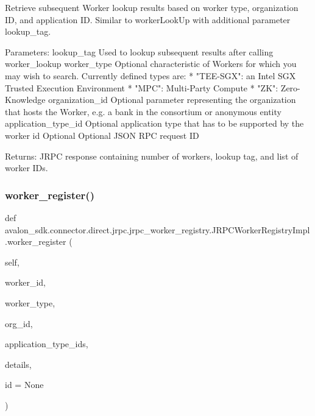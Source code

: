 \begin{DoxyVerb}Retrieve subsequent Worker lookup results based on worker type,
organization ID, and application ID.
Similar to workerLookUp with additional parameter lookup_tag.

Parameters:
lookup_tag          Used to lookup subsequent results after calling
            worker_lookup
worker_type         Optional characteristic of Workers for which you
            may wish to search. Currently defined types are:
            * "TEE-SGX": an Intel SGX Trusted Execution
              Environment
            * "MPC": Multi-Party Compute
            * "ZK": Zero-Knowledge
organization_id     Optional parameter representing the
            organization that hosts the Worker,
            e.g. a bank in the consortium or
            anonymous entity
application_type_id Optional application type that has to be supported
            by the worker
id                  Optional Optional JSON RPC request ID

Returns:
JRPC response containing number of workers,
lookup tag, and list of worker IDs.
\end{DoxyVerb}
 \mbox{\label{classavalon__sdk_1_1connector_1_1direct_1_1jrpc_1_1jrpc__worker__registry_1_1JRPCWorkerRegistryImpl_aefb2c49948e048e5eb4dee5c86818d46}} 
\subsubsection{\texorpdfstring{worker\+\_\+register()}{worker\_register()}}
{\footnotesize\ttfamily def avalon\+\_\+sdk.\+connector.\+direct.\+jrpc.\+jrpc\+\_\+worker\+\_\+registry.\+J\+R\+P\+C\+Worker\+Registry\+Impl.\+worker\+\_\+register (\begin{DoxyParamCaption}\item[{}]{self,  }\item[{}]{worker\+\_\+id,  }\item[{}]{worker\+\_\+type,  }\item[{}]{org\+\_\+id,  }\item[{}]{application\+\_\+type\+\_\+ids,  }\item[{}]{details,  }\item[{}]{id = {\ttfamily None} }\end{DoxyParamCaption})}

